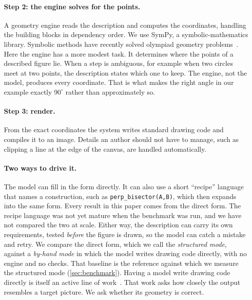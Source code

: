 \paragraph{Step 2: the engine solves for the points.}
A geometry engine reads the description and computes the coordinates, handling the building blocks in dependency order. We use SymPy, a symbolic-mathematics library. Symbolic methods have recently solved olympiad geometry problems~\citep{trinh2024alphageometry}. Here the engine has a more modest task. It determines where the points of a described figure lie. When a step is ambiguous, for example when two circles meet at two points, the description states which one to keep. The engine, not the model, produces every coordinate. That is what makes the right angle in our example exactly $90^\circ$ rather than approximately so.

\paragraph{Step 3: render.}
From the exact coordinates the system writes standard drawing code and compiles it to an image. Details an author should not have to manage, such as clipping a line at the edge of the canvas, are handled automatically.

\paragraph{Two ways to drive it.}
The model can fill in the form directly. It can also use a short ``recipe'' language that names a construction, such as \texttt{perp\_bisector(A,B)}, which then expands into the same form. Every result in this paper comes from the direct form. The recipe language was not yet mature when the benchmark was run, and we have not compared the two at scale. Either way, the description can carry its own requirements, tested \emph{before} the figure is drawn, so the model can catch a mistake and retry. We compare the direct form, which we call the \emph{structured mode}, against a \emph{by-hand mode} in which the model writes drawing code directly, with no engine and no checks. That baseline is the reference against which we measure the structured mode (\cref{sec:benchmark}). Having a model write drawing code directly is itself an active line of work~\citep{belouadi2024automatikz,belouadi2024detikzify}. That work asks how closely the output resembles a target picture. We ask whether its geometry is correct.
